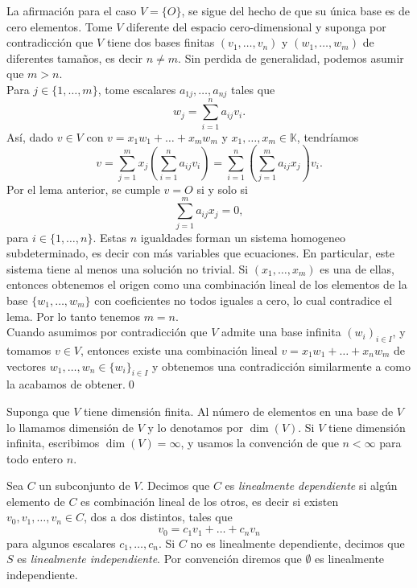 \dem La afirmaci\'on para el caso $V=\{O\}$, se sigue del hecho de que su \'unica base es de cero elementos. Tome $V$ diferente del espacio cero-dimensional y suponga por contradicci\'on que $V$ tiene dos bases finitas $(v_1,\ldots, v_n)$ y $(w_1,\ldots, w_m)$ de diferentes tamaños, es decir $n\ne m$. Sin perdida de generalidad, podemos asumir que $m>n$.\\
Para $j\in\{1,\ldots,m\}$, tome escalares $a_{1j},\ldots,a_{nj}$ tales que $$w_j=\sum_{i=1}^n a_{ij}v_i.$$ As\'i, dado $v\in V$ con $v=x_1w_1+\ldots+x_mw_m$ y $x_1,\ldots,x_m\in\mathbb{K}$, tendr\'iamos
$$v = \sum_{j=1}^m x_j\left(\sum_{i=1}^n a_{ij}v_i\right) = \sum_{i=1}^n\left(\sum_{j=1}^m a_{ij}x_j\right)v_i.$$
Por el lema anterior, se cumple $v=O$ si y solo si
\[
\sum_{j=1}^m a_{ij}x_j=0,
\]
para $i\in\{1,\ldots,n\}$. Estas $n$ igualdades forman un sistema homogeneo subdeterminado, es decir con m\'as variables que ecuaciones. En particular, este sistema tiene al menos una solución no trivial. Si $(x_1,\ldots,x_m)$ es una de ellas, entonces obtenemos el origen como una combinaci\'on lineal de los elementos de la base $\{w_1,\ldots, w_m\}$ con coeficientes no todos iguales a cero, lo cual contradice el lema. Por lo tanto tenemos $m=n$.\\
Cuando asumimos por contradicción que $V$ admite una base infinita $(w_i)_{i\in I}$, y tomamos $v\in V$, entonces existe una combinación lineal $v=x_1w_1+\ldots+x_nw_m$ de vectores $w_1,\ldots,w_n\in\{w_i\}_{i\in I}$ y obtenemos una contradicción similarmente a como la acabamos de obtener.\qed

\begin{defn}
Suponga que $V$ tiene dimensi\'on finita. Al n\'umero de elementos en una base de $V$ lo llamamos dimensi\'on de $V$ y lo denotamos por $\dim (V)$. Si $V$ tiene dimensi\'on infinita, escribimos $\dim(V)=\infty$, y usamos la convenci\'on de que $n<\infty$ para todo entero $n$.
\end{defn}

\begin{defn}
Sea $C$ un subconjunto de $V$. Decimos que $C$ es \emph{linealmente dependiente} si alg\'un elemento de $C$ es combinaci\'on lineal de los otros, es decir si existen $v_0,v_1,\ldots,v_n\in C$, dos a dos distintos, tales que
\[
v_0=c_1v_1+\ldots+c_nv_n
\]
para algunos escalares $c_1,\ldots,c_n$. Si $C$ no es linealmente dependiente, decimos que $S$ es \emph{linealmente independiente}. Por convención diremos que $\emptyset$ es linealmente independiente.
\end{defn}

